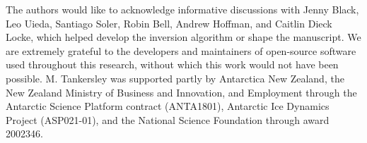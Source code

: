 \documentclass[tc, manuscript]{copernicus}
\begin{document}
\appendixtables   %







\begin{acknowledgements}
The authors would like to acknowledge informative discussions with Jenny Black, Leo Uieda, Santiago Soler, Robin Bell, Andrew Hoffman, and Caitlin Dieck Locke, which helped develop the inversion algorithm or shape the manuscript. We are extremely grateful to the developers and maintainers of open-source software used throughout this research, without which this work would not have been possible. M. Tankersley was supported partly by Antarctica New Zealand, the New Zealand Ministry of Business and Innovation, and Employment through the Antarctic Science Platform contract (ANTA1801), Antarctic Ice Dynamics Project (ASP021-01), and the National Science Foundation through award 2002346.
\end{acknowledgements}












\end{document}
